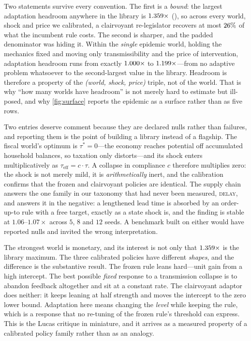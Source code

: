 \documentclass[11pt]{article}
\begin{document}
Two statements survive every convention. The first is a \emph{bound}: the largest adaptation headroom
anywhere in the library is $1.359\times$ (\libBestWorld), so across every world, shock and
price we calibrated, a clairvoyant re-legislator recovers at most $26\%$ of what the
incumbent rule costs. The second is sharper, and the padded denominator was hiding it. Within the
\emph{single} epidemic world, holding the mechanics fixed and moving only transmissibility and the
price of intervention, adaptation headroom runs from exactly $1.000\times$ to
$1.199\times$---from no adaptive problem whatsoever to the second-largest value in the library.
Headroom is therefore a property of the \emph{(world, shock, price)} triple, not of the world. That
is why ``how many worlds have headroom'' is not merely hard to estimate but ill-posed, and why
\cref{fig:surface} reports the epidemic as a surface rather than as five rows.

Two entries deserve comment because they are declared nulls rather than failures, and reporting them
is the point of building a library instead of a flagship. The fiscal world's optimum is
$\tau^\ast = 0$---the economy reaches potential off accumulated household balances, so taxation only
distorts---and its shock enters multiplicatively as $\tau_{\text{eff}} = c \cdot \tau$. A collapse in
compliance $c$ therefore multiplies zero: the shock is not merely mild, it is \emph{arithmetically}
inert, and the calibration confirms that the frozen and clairvoyant policies are identical. The
supply chain answers the one family in our taxonomy that had never been measured, \textsc{delay}, and
answers it in the negative: a lengthened lead time is absorbed by an order-up-to rule with a free
target, exactly as a state shock is, and the finding is stable at $1.06$--$1.07\times$ across $5$,
$8$ and $12$ seeds. A benchmark built on either would have reported nulls and invited the wrong
interpretation.

The strongest world is monetary, and its interest is not only that
$1.359{}\times$ is the library maximum. The three calibrated policies have different
\emph{shapes}, and the difference is the substantive result. The frozen rule leans hard---unit gain
from a high intercept. The best possible \emph{fixed} response to a transmission collapse is to
abandon feedback altogether and sit at a constant rate. The clairvoyant adaptor does neither: it
keeps leaning at half strength and moves the intercept to the zero lower bound. Adaptation here means
changing the \emph{level} while keeping the rule, which is a response that no re-tuning of the frozen
rule's threshold can express. This is the Lucas critique in miniature, and it arrives as a measured
property of a calibrated policy family rather than as an analogy.
\end{document}
